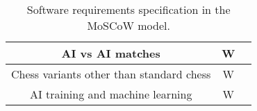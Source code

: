 \begin{table}[H]
{\begin{tabular}{ccc}
            \\ \midrule
            AI vs AI matches                         & W                        & {\ul~\ref{subsubsec:ai-engines}}
            \\ \midrule
            Chess variants other than standard chess & W                        & {\ul~\ref{sec:chess}}
            \\ \midrule
            AI training and machine learning         & W                        & {\ul~\ref{subsubsec:ai-engines}}
            \\ \bottomrule
        \end{tabular}%
    }
    \caption{Software requirements specification in the MoSCoW model.}\label{tab:srs}
\end{table}
